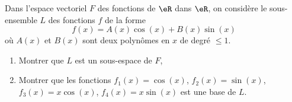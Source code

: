 \begin{exercice}\label{exoLineraire0027}

	Dans l'espace vectoriel $F$ des fonctions de $\eR$ dans $\eR$, on considère le sous-ensemble $L$ des fonctions $f$ de la forme
	\begin{equation}
		f(x)=A(x)\cos(x)+B(x)\sin(x)
	\end{equation}
	où $A(x)$ et $B(x)$ sont deux polynômes en $x$ de degré $\leq 1$.
	\begin{enumerate}

		\item
			Montrer que $L$ est un sous-espace de $F$,
		\item
			Montrer que les fonctions $f_1(x)=\cos(x)$, $f_2(x)=\sin(x)$, $f_3(x)=x\cos(x)$, $f_4(x)=x\sin(x)$ est une base de $L$.

	\end{enumerate}

\end{exercice}

